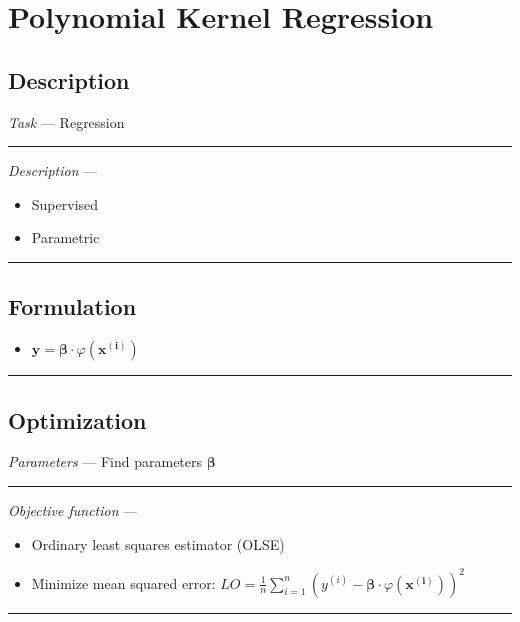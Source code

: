 \section{Polynomial Kernel Regression}
\subsection*{Description}
\emph{Task} --- Regression

{\color{lightgray}\hrule height 0.001mm}

\emph{Description} --- 
\begin{itemize}
    \item Supervised
    \item Parametric
\end{itemize}

{\color{black}\hrule height 0.001mm}

\subsection*{Formulation}

\begin{itemize}
    \item $\boldsymbol{y} = \boldsymbol{\beta} \cdot \varphi(\boldsymbol{x^{(i)}})$
\end{itemize}

{\color{black}\hrule height 0.001mm}

\subsection*{Optimization}
\emph{Parameters} --- Find parameters $\boldsymbol{\beta}$

{\color{lightgray}\hrule height 0.001mm}

\emph{Objective function} --- 
\begin{itemize}
    \item Ordinary least squares estimator (OLSE)
    \item Minimize mean squared error: $LO = \frac{1}{n} \sum_{i=1}^n ( y^{(i)} - \boldsymbol{\beta} \cdot \varphi(\boldsymbol{x^{(i)}} ))^2$
\end{itemize}

{\color{lightgray}\hrule height 0.001mm}


